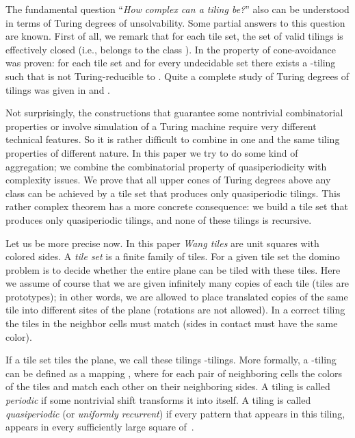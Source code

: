 \documentclass[runningheads]{llncs}
\begin{document}
The fundamental question ``\emph{How complex can a tiling be?}'' also can be understood in terms of Turing degrees of unsolvability.   Some partial answers to this question are known.  First of all, we remark that for each tile set, the set of valid tilings is effectively closed  (i.e., belongs to the class ). 
In \cite{dls} the property of cone-avoidance  was proven: for each tile set  and for every undecidable set  there exists a -tiling  such that  is not Turing-reducible to .
Quite a complete study of Turing degrees of tilings was given in \cite{pascal1} and \cite{pascal2}. 

Not surprisingly, the constructions that guarantee some nontrivial combinatorial properties or involve simulation of a Turing machine require very different technical features. So it is  rather difficult to combine in one and  the same tiling properties of different nature.
In this paper we try to do some kind of aggregation;  we combine  the combinatorial property of quasiperiodicity with complexity issues. We prove that all upper cones of Turing degrees above any  class can be achieved by a tile set that produces only quasiperiodic tilings. This rather complex theorem has a more concrete consequence: we build a tile set that produces only quasiperiodic tilings, and none of these tilings is recursive.




Let us be more precise now. In this paper  \emph{Wang tiles} are unit squares with colored sides. A \emph{tile set} is a finite family of tiles. For a given tile set the domino problem is to decide whether the entire plane can be tiled with these tiles. Here we assume of course that we are given infinitely many copies of each tile (tiles are prototypes); in other words, we are allowed to  place translated copies of the same tile into different sites of the plane (rotations are not allowed). In a correct tiling the tiles in the neighbor cells must match (sides in contact must have the same color). 

If a tile set  tiles the plane, we call these tilings -tilings. More formally,  a -tiling can be defined as a mapping , where for each pair of neighboring cells    the colors of the tiles  and   match each other on their neighboring sides.
A tiling is called \emph{periodic} if some nontrivial shift transforms it into itself. A tiling  is called \emph{quasiperiodic} (or \emph{uniformly recurrent}) if 
every pattern that appears in this tiling,  appears in every sufficiently large square of~.
\end{document}
